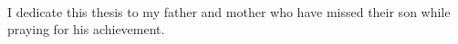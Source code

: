 \begin{center}
\\
\end{center}

I dedicate this thesis to my father and mother who have missed their son while praying for his achievement.